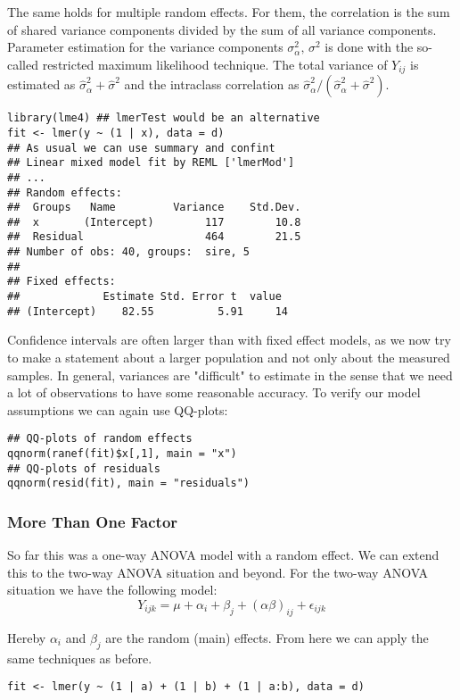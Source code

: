 The same holds for multiple random effects. For them, the correlation is the sum of shared variance components divided by the sum of all variance components. Parameter estimation for the variance components $\sigma_\alpha^2,\, \sigma^2$ is done with the so-called restricted maximum likelihood technique. The total variance of $Y_{ij}$ is estimated as $\hat \sigma_\alpha^2 + \hat \sigma^2$ and the intraclass correlation as $ \hat \sigma_\alpha^2 / (\hat \sigma_\alpha^2 + \hat \sigma^2)$.

\begin{lstlisting}
library(lme4) ## lmerTest would be an alternative
fit <- lmer(y ~ (1 | x), data = d)
## As usual we can use summary and confint
## Linear mixed model fit by REML ['lmerMod']
## ...
## Random effects:
##  Groups   Name         Variance    Std.Dev.
##  x       (Intercept)        117        10.8    
##  Residual                   464        21.5    
## Number of obs: 40, groups:  sire, 5
## 
## Fixed effects:
##             Estimate Std. Error t  value
## (Intercept)    82.55          5.91     14
\end{lstlisting}

Confidence intervals are often larger than with fixed effect models, as we now try to make a statement about a larger population and not only about the measured samples. In general, variances are "difficult" to estimate in the sense that we need a lot of observations to have some reasonable accuracy. To verify our model assumptions we can again use QQ-plots:
\begin{lstlisting}
## QQ-plots of random effects
qqnorm(ranef(fit)$x[,1], main = "x")
## QQ-plots of residuals
qqnorm(resid(fit), main = "residuals")
\end{lstlisting}

\subsubsection{More Than One Factor}

So far this was a one-way ANOVA model with a random effect. We can extend this to the two-way ANOVA situation and beyond. For the two-way ANOVA situation we have the following model:
$$Y_{ijk} = \mu + \alpha_i + \beta_j + (\alpha \beta)_{ij} + \epsilon_{ijk}$$

Hereby $\alpha_i$ and $\beta_j$ are the random (main) effects. From here we can apply the same techniques as before.
\begin{lstlisting}
fit <- lmer(y ~ (1 | a) + (1 | b) + (1 | a:b), data = d)
\end{lstlisting}

